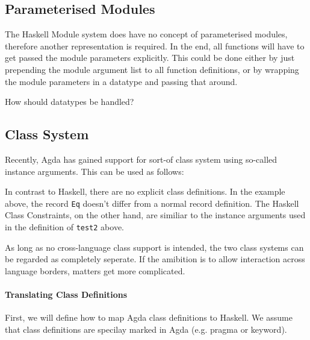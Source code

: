 \documentclass[12pt, a4paper, twoside]{report}
\begin{document}
\subsection{Parameterised Modules}
The Haskell Module system does have no concept of parameterised modules, therefore another representation is required. In the end,
all functions will have to get passed the module parameters explicitly. This could be done either by just prepending the module
argument list to all function definitions, or by wrapping the module parameters in a datatype and passing that around.

How should datatypes be handled?

\subsection{Class System}
Recently, Agda has gained support for sort-of class system using so-called instance arguments. This can
be used as follows:


In contrast to Haskell, there are no explicit class definitions. In the example above,
the record \texttt{Eq} doesn't differ from a normal record definition.
The Haskell Class Constraints, on the other hand, are similiar to the instance
arguments used in the definition of \texttt{test2} above.

As long as no cross-language class support is intended, the two class systems can be
regarded as completely seperate. If the amibition is to allow interaction across
language borders, matters get more complicated.

\paragraph{Translating Class Definitions}
First, we will define how to map Agda class definitions to Haskell. We assume
that class definitions are specilay marked in Agda (e.g. pragma or keyword).
\end{document}
